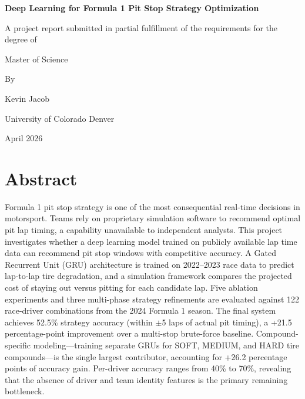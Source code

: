 \documentclass[12pt]{article}
\begin{document}
\begin{titlepage}
\centering
\vspace*{2cm}
{\LARGE\bfseries Deep Learning for Formula 1 Pit Stop Strategy Optimization\par}
\vspace{1.5cm}
{\large A project report submitted in partial fulfillment of the requirements for the degree of\par}
\vspace{0.5cm}
{\large Master of Science\par}
\vspace{1cm}
{\large By\par}
{\large Kevin Jacob\par}
\vspace{0.5cm}
{\large University of Colorado Denver\par}
\vspace{2cm}
{\large April 2026\par}
\vspace{3cm}
\end{titlepage}

\newpage
\section*{Abstract}

Formula 1 pit stop strategy is one of the most consequential real-time decisions in motorsport. Teams rely on proprietary simulation software to recommend optimal pit lap timing, a capability unavailable to independent analysts. This project investigates whether a deep learning model trained on publicly available lap time data can recommend pit stop windows with competitive accuracy. A Gated Recurrent Unit (GRU) architecture is trained on 2022--2023 race data to predict lap-to-lap tire degradation, and a simulation framework compares the projected cost of staying out versus pitting for each candidate lap. Five ablation experiments and three multi-phase strategy refinements are evaluated against 122 race-driver combinations from the 2024 Formula 1 season. The final system achieves 52.5\% strategy accuracy (within $\pm$5 laps of actual pit timing), a +21.5 percentage-point improvement over a multi-stop brute-force baseline. Compound-specific modeling---training separate GRUs for SOFT, MEDIUM, and HARD tire compounds---is the single largest contributor, accounting for +26.2 percentage points of accuracy gain. Per-driver accuracy ranges from 40\% to 70\%, revealing that the absence of driver and team identity features is the primary remaining bottleneck.
\end{document}
